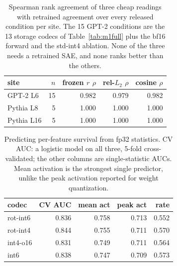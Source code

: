 \begin{table}[htbp]
\caption{Spearman rank agreement of three cheap readings with retrained agreement over every released condition per site. The 15 GPT-2 conditions are the 13 storage codecs of Table~\ref{tab:m1full} plus the bf16 forward and the std-int4 ablation. None of the three needs a retrained SAE, and none ranks better than the others.}
\label{tab:proxyrank}
\centering\small
\begin{tabular}{lrrrr}
\toprule
site & $n$ & frozen $r$ $\rho$ & rel-$L_2$ $\rho$ & cosine $\rho$ \\
\midrule
GPT-2 L6 & 15 & 0.982 & 0.979 & 0.982 \\
Pythia L8 & 5 & 1.000 & 1.000 & 1.000 \\
Pythia L16 & 5 & 1.000 & 1.000 & 1.000 \\
\bottomrule
\end{tabular}
\end{table}

\begin{table}[htbp]
\caption{Predicting per-feature survival from fp32 statistics. CV AUC: a logistic model on all three, 5-fold cross-validated; the other columns are single-statistic AUCs. Mean activation is the strongest single predictor, unlike the peak activation reported for weight quantization.}
\label{tab:fragility}
\centering\small
\begin{tabular}{lrrrr}
\toprule
codec & CV AUC & mean act & peak act & rate \\
\midrule
rot-int6 & 0.836 & 0.758 & 0.713 & 0.552 \\
rot-int4 & 0.844 & 0.755 & 0.711 & 0.570 \\
int4-o16 & 0.831 & 0.749 & 0.711 & 0.564 \\
int6 & 0.838 & 0.747 & 0.709 & 0.573 \\
\bottomrule
\end{tabular}
\end{table}

